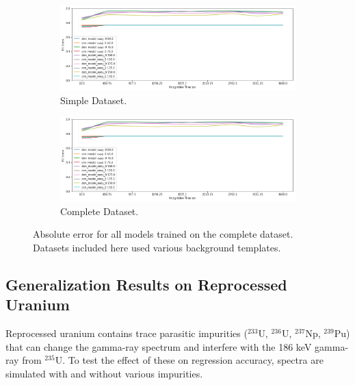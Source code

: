 \begin{figure}[H]
     \centering
     \begin{subfigure}[b]{0.9\textwidth}
         \centering
         \includegraphics[width=\textwidth]{images/results_easy_distance_comparison}
         \caption{Simple Dataset.}
         \label{fig:results_full_background_inject_simple}
     \end{subfigure}

     \begin{subfigure}[b]{0.9\textwidth}
         \centering
         \includegraphics[width=\textwidth]{images/results_easy_distance_comparison}
         \caption{Complete Dataset.}
         \label{fig:results_full_background_inject_full}
     \end{subfigure}
        \caption{Absolute error for all models trained on the complete dataset. Datasets included here used various background templates.}
        \label{fig:results_full_background_inject}
\end{figure}


\subsection{Generalization Results on Reprocessed Uranium}

Reprocessed uranium contains trace parasitic impurities ($^{233}$U, $^{236}$U, $^{237}$Np, $^{239}$Pu) that can change the gamma-ray spectrum and interfere with the 186 keV gamma-ray from $^{235}$U. To test the effect of these on regression accuracy, spectra are simulated with and without various impurities.


